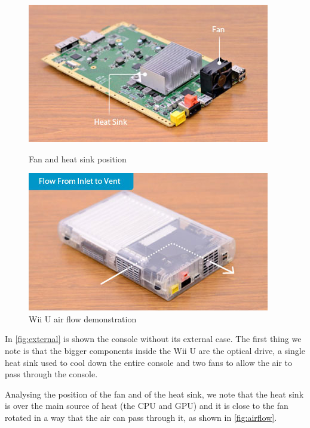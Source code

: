 \documentclass[11pt,a4paper,titlepage]{article}
\begin{document}
						\begin{figure}[ht]
							\centering
							\begin{minipage}{0.45\textwidth}
								\centering
								\includegraphics[width=\textwidth]{fan-heatsink.jpeg}
								\caption{Fan and heat sink position}
								\label{fig:fan-heatsink}
							\end{minipage}
							\begin{minipage}{0.45\textwidth}
								\centering
								\includegraphics[width=\textwidth]{air_flow.jpeg}
								\caption{Wii U air flow demonstration}
								\label{fig:airflow}
							\end{minipage}
						\end{figure}
						In \autoref{fig:external} is shown the console without its external case.
						The first thing we note is that the bigger components inside the Wii U are the optical drive, a single heat sink used to cool down the entire console and two fans to allow the air to pass through the console.

						Analysing the position of the fan and of the heat sink, we note that the heat sink is over the main source of heat (the CPU and GPU) and it is close to the fan rotated in a way that the air can pass through it, as shown in \autoref{fig:airflow}.
\end{document}
